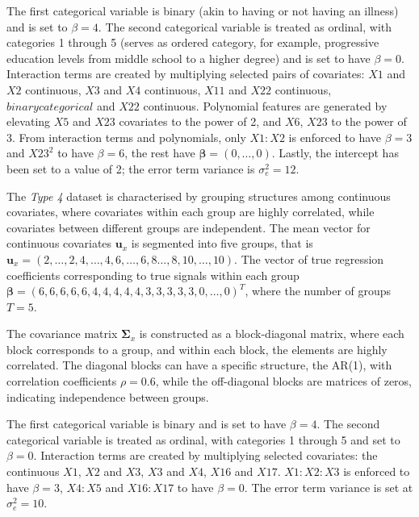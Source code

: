 \documentclass[
  11pt,
]{article}
\begin{document}
The first categorical variable is binary (akin to having or not having
an illness) and is set to \(\beta = 4\). The second categorical variable
is treated as ordinal, with categories 1 through 5 (serves as ordered
category, for example, progressive education levels from middle school
to a higher degree) and is set to have \(\beta = 0\). Interaction terms
are created by multiplying selected pairs of covariates: \(X1\) and
\(X2\) continuous, \(X3\) and \(X4\) continuous, \(X11\) and \(X22\)
continuous, \(binary categorical\) and \(X22\) continuous. Polynomial
features are generated by elevating \(X5\) and \(X23\) covariates to the
power of 2, and \(X6\), \(X23\) to the power of 3. From interaction
terms and polynomials, only \(X1 : X2\) is enforced to have
\(\beta = 3\) and \(X23^2\) to have \(\beta = 6\), the rest have
\(\boldsymbol{\beta} = (0, \ldots, 0)\). Lastly, the intercept has been
set to a value of 2; the error term variance is \(\sigma_e^2 = 12\).

\hfill\break

The \emph{Type 4} dataset is characterised by grouping structures among
continuous covariates, where covariates within each group are highly
correlated, while covariates between different groups are independent.
The mean vector for continuous covariates \(\mathbf{u}_x\) is segmented
into five groups, that is
\(\mathbf{u}_x = (2, \ldots, 2, 4, \ldots, 4, 6, \ldots, 6, 8 \ldots, 8, 10, \ldots, 10)\).
The vector of true regression coefficients corresponding to true signals
within each group
\(\boldsymbol{\beta} = (6, 6, 6, 6, 6, 4, 4, 4, 4, 4, 3, 3, 3, 3, 3, 0, \ldots, 0)^T\),
where the number of groups \(T = 5\).

The covariance matrix \(\mathbf{\Sigma}_x\) is constructed as a
block-diagonal matrix, where each block corresponds to a group, and
within each block, the elements are highly correlated. The diagonal
blocks can have a specific structure, the AR(1), with correlation
coefficients \(\rho = 0.6\), while the off-diagonal blocks are matrices
of zeros, indicating independence between groups.

The first categorical variable is binary and is set to have
\(\beta = 4\). The second categorical variable is treated as ordinal,
with categories 1 through 5 and set to \(\beta = 0\). Interaction terms
are created by multiplying selected covariates: the continuous \(X1\),
\(X2\) and \(X3\), \(X3\) and \(X4\), \(X16\) and \(X17\). \(X1:X2:X3\)
is enforced to have \(\beta = 3\), \(X4 : X5\) and \(X16 : X17\) to have
\(\beta = 0\). The error term variance is set at \(\sigma_e^2 = 10\).
\end{document}
